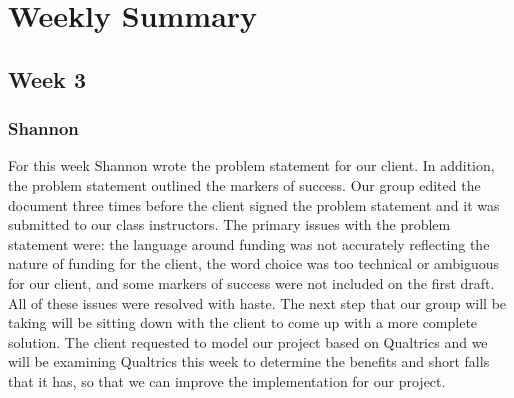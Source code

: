 \documentclass[letterpaper,10pt,serif, draftclsnofoot,onecolumn, compsoc, titlepage]{IEEEtran}
\begin{document}
\section{Weekly Summary}
\subsection{Week 3}
\subsubsection{Shannon}
For this week Shannon wrote the problem statement for our client. In addition, the problem statement outlined the markers of success. Our group edited the document three times before the client signed the problem statement and it was submitted to our class instructors. The primary issues with the problem statement were: the language around funding was not accurately reflecting the nature of funding for the client, the word choice was too technical or ambiguous for our client, and some markers of success were not included on the first draft. All of these issues were resolved with haste. The next step that our group will be taking will be sitting down with the client to come up with a more complete solution. The client requested to model our project based on Qualtrics and we will be examining Qualtrics this week to determine the benefits and short falls that it has, so that we can improve the implementation for our project. 
\end{document}
